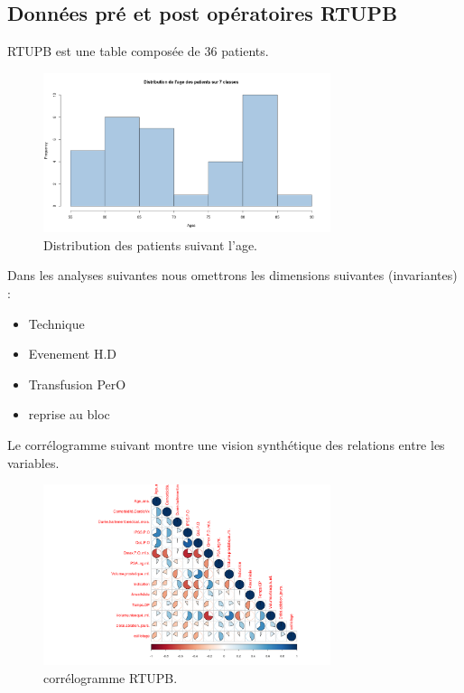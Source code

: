 \subsection{Données pré et post opératoires RTUPB}

RTUPB est une table composée de 36 patients. 
	
\begin{figure}[!h]
\centering
\includegraphics[width=0.75\textwidth]{../Fig/rtupb-age-frequency.png}
\caption{Distribution des patients suivant l'age.}
\end{figure}

Dans les analyses suivantes nous omettrons les dimensions suivantes  (invariantes)  :  
\begin{itemize}
\item Technique
\item Evenement H.D
\item Transfusion PerO
\item reprise au bloc 
\end{itemize}

Le corrélogramme suivant montre une vision synthétique des relations  entre les variables.
\begin{figure}[!h]
\centering
\includegraphics[width=0.75\textwidth]{../Fig/rtupb-matrice-cor-graph.png}
\caption{corrélogramme RTUPB.}
\end{figure}

